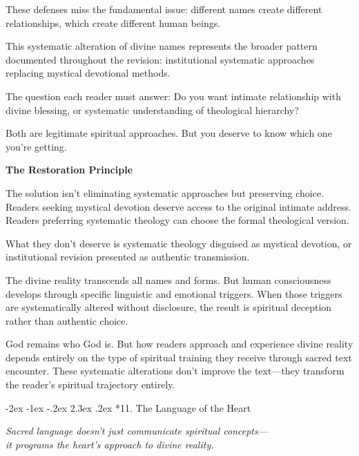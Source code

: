 \documentclass[12pt,twoside]{book}
\makeatletter
\def\cleardoublepage{\clearpage\if@twoside \ifodd\c@page\else\hbox{}\thispagestyle{empty}\newpage\if@twocolumn\hbox{}\newpage\fi\fi\fi}
\renewcommand\section{\@startsection{section}{1}{\z@}%
{-2ex \@plus -1ex \@minus -.2ex}%
{2.3ex \@plus.2ex}%
{\normalfont\Large\bfseries}}
\makeatother
\begin{document}
These defenses miss the fundamental issue: different names create different relationships, which create different human beings.

This systematic alteration of divine names represents the broader pattern documented throughout the revision: institutional systematic approaches replacing mystical devotional methods.

The question each reader must answer: Do you want intimate relationship with divine blessing, or systematic understanding of theological hierarchy?

Both are legitimate spiritual approaches. But you deserve to know which one you're getting.



\vspace{0.5cm}
\textbf{The Restoration Principle}
\vspace{0.2cm}


The solution isn't eliminating systematic approaches but preserving choice. Readers seeking mystical devotion deserve access to the original intimate address. Readers preferring systematic theology can choose the formal theological version.

What they don't deserve is systematic theology disguised as mystical devotion, or institutional revision presented as authentic transmission.

The divine reality transcends all names and forms. But human consciousness develops through specific linguistic and emotional triggers. When those triggers are systematically altered without disclosure, the result is spiritual deception rather than authentic choice.

God remains who God is. But how readers approach and experience divine reality depends entirely on the type of spiritual training they receive through sacred text encounter. These systematic alterations don't improve the text—they transform the reader's spiritual trajectory entirely.


\cleardoublepage
\vspace*{0.20\textheight}
\section*{11. The Language of the Heart}
\thispagestyle{chapterpage}

{\centering\itshape Sacred language doesn't just communicate spiritual concepts—\\it programs the heart's approach to divine reality.\par}
\vspace{0.3cm}
\end{document}
